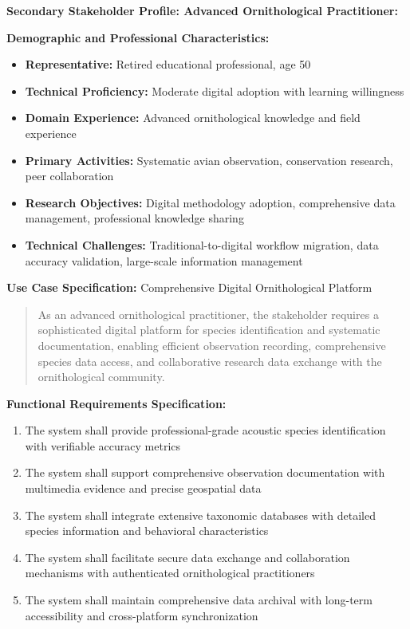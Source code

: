 \textbf{Secondary Stakeholder Profile: Advanced Ornithological Practitioner:}

\textbf{Demographic and Professional Characteristics:}
\begin{itemize}
    \item \textbf{Representative:} Retired educational professional, age 50
    \item \textbf{Technical Proficiency:} Moderate digital adoption with learning willingness
    \item \textbf{Domain Experience:} Advanced ornithological knowledge and field experience
    \item \textbf{Primary Activities:} Systematic avian observation, conservation research, peer collaboration
    \item \textbf{Research Objectives:} Digital methodology adoption, comprehensive data management, professional knowledge sharing
    \item \textbf{Technical Challenges:} Traditional-to-digital workflow migration, data accuracy validation, large-scale information management
\end{itemize}

\textbf{Use Case Specification:} Comprehensive Digital Ornithological Platform
\begin{quote}
As an advanced ornithological practitioner, the stakeholder requires a sophisticated digital platform for species identification and systematic documentation, enabling efficient observation recording, comprehensive species data access, and collaborative research data exchange with the ornithological community.
\end{quote}

\textbf{Functional Requirements Specification:}
\begin{enumerate}
    \item The system shall provide professional-grade acoustic species identification with verifiable accuracy metrics
    \item The system shall support comprehensive observation documentation with multimedia evidence and precise geospatial data
    \item The system shall integrate extensive taxonomic databases with detailed species information and behavioral characteristics
    \item The system shall facilitate secure data exchange and collaboration mechanisms with authenticated ornithological practitioners
    \item The system shall maintain comprehensive data archival with long-term accessibility and cross-platform synchronization
\end{enumerate}

